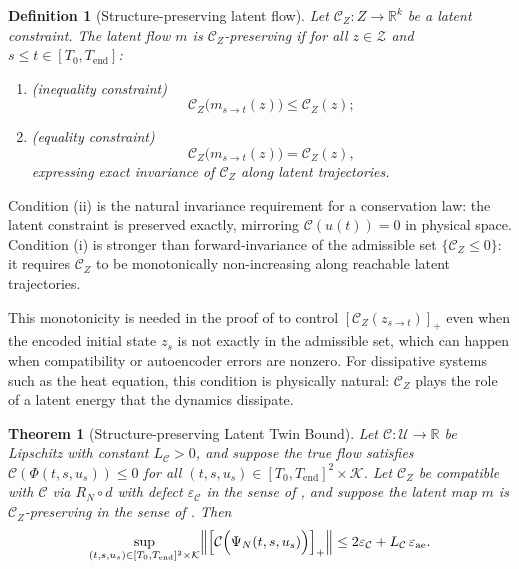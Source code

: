 \documentclass[a4paper,fleqn]{cas-sc}
\theoremstyle{thmstyleone}%
\newtheorem{theorem}{Theorem}%
\theoremstyle{thmstyletwo}%
\theoremstyle{thmstylethree}%
\newtheorem{definition}{Definition}%
\begin{document}
\begin{definition}[Structure-preserving latent flow]
\label{def:structure-preserving}
Let $\mathcal{C}_Z : Z \to \mathbb{R}^k$ be a latent constraint. The latent flow $m$ is \emph{$\mathcal{C}_Z$-preserving} if for all $z \in \mathcal{Z}$ and $s \leq t \in [T_0,T_{\mathrm{end}}]$:
\begin{enumerate}
    \item[(i)] \emph{(inequality constraint)}
    \[
    \mathcal{C}_Z\bigl(m_{s\to t}(z)\bigr) \leq \mathcal{C}_Z(z);
    \]
    \item[(ii)] \emph{(equality constraint)}
    \[
    \mathcal{C}_Z\bigl(m_{s\to t}(z)\bigr) = \mathcal{C}_Z(z),
    \]
    expressing exact invariance of $\mathcal{C}_Z$ along latent trajectories.
\end{enumerate}

\end{definition}

Condition (ii) is the natural invariance requirement for a conservation law: the latent constraint is preserved exactly, mirroring $\mathcal{C}(u(t)) = 0$ in physical space.
Condition (i) is stronger than forward-invariance of the admissible set $\{\mathcal C_Z\leq 0\}$: it requires $\mathcal C_Z$ to be monotonically non-increasing along reachable latent trajectories.

This monotonicity is needed in the proof of  to control $[\mathcal C_Z(z_{s\to t})]_+$ even when the encoded initial state $z_s$ is not exactly in the admissible set, which can happen when compatibility or autoencoder errors are nonzero. For dissipative systems such as the heat equation, this condition is physically natural: $\mathcal{C}_Z$ plays the role of a latent energy that the dynamics dissipate.

\begin{theorem}[Structure-preserving Latent Twin Bound]
\label{thm:apriori}
Let $\mathcal{C} : \mathcal{U} \to \mathbb{R}$ be Lipschitz with constant $L_{\mathcal{C}} > 0$, and suppose the true flow satisfies $\mathcal{C}(\Phi(t,s,u_s)) \leq 0$ for all $(t,s, u_s) \in [T_0,T_{\mathrm{end}}]^2 \times \mathcal K$. Let  $\mathcal{C}_Z$ be compatible with $\mathcal{C}$ via $R_N \circ d$ with defect $\varepsilon_{\mathcal{C}}$ in the sense of , and suppose the latent map $m$ is $\mathcal{C}_Z$-preserving  in the sense of . Then
\[
\sup_{(t,s,u_s)\in[T_0,T_{\mathrm{end}}]^2\times \mathcal K} \Bigl\|\Bigl[ \mathcal{C}\Bigl( \Psi_{N} (t,s,u_s) \Bigr) \Bigr]_+\Bigr\| \le 2\varepsilon_{\mathcal{C}} + L_{\mathcal{C}}\,\varepsilon_{\mathrm{ae}}.
\]
\end{theorem}
\end{document}
